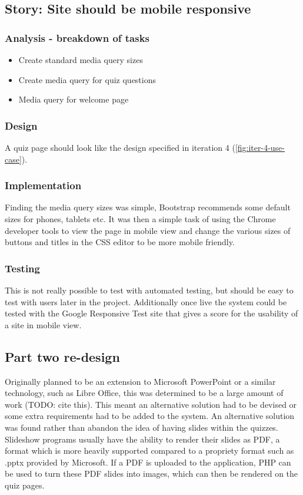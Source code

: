 \subsection{Story: Site should be mobile responsive}
\subsubsection{Analysis - breakdown of tasks}
\begin{itemize}
	\item Create standard media query sizes
	\item Create media query for quiz questions
	\item Media query for welcome page
\end{itemize}
\subsubsection{Design}
A quiz page should look like the design specified in iteration 4  (\ref{fig:iter-4-use-case}).
\subsubsection{Implementation}
Finding the media query sizes was simple, Bootstrap recommends some default sizes for phones, tablets etc\cite{bootstrap-media-queries}. It was then a simple task of using the Chrome developer tools to view the page in mobile view and change the various sizes of buttons and titles in the CSS editor to be more mobile friendly.
\subsubsection{Testing}
This is not really possible to test with automated testing, but should be easy to test with users later in the project. Additionally once live the system could be tested with the Google Responsive Test site that gives a score for the usability of a site in mobile view.
\newpage

\subsection{Part two re-design}
Originally planned to be an extension to Microsoft PowerPoint or a similar technology, such as Libre Office, this was determined to be a large amount of work (TODO: cite this). This meant an alternative solution had to be devised or some extra requirements had to be added to the system. An alternative solution was found rather than abandon the idea of having slides within the quizzes. Slideshow programs usually have the ability to render their slides as PDF, a format which is more heavily supported compared to a propriety format such as .pptx provided by Microsoft. If a PDF is uploaded to the application, PHP can be used to turn these PDF slides into images, which can then be rendered on the quiz pages.


